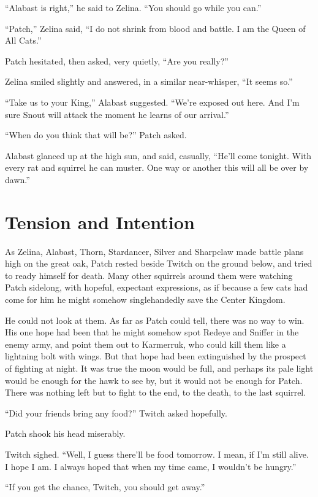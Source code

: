 \documentclass[12pt]{memoir}
\begin{document}
“Alabast is right,” he said to Zelina. “You should go while you can.”

“Patch,” Zelina said, “I do not shrink from blood and battle. I am the
Queen of All Cats.”

Patch hesitated, then asked, very quietly, “Are you really?”

Zelina smiled slightly and answered, in a similar near-whisper, “It
seems so.”

“Take us to your King,” Alabast suggested. “We’re exposed out
here. And I’m sure Snout will attack the moment he learns of our
arrival.”

“When do you think that will be?” Patch asked.

Alabast glanced up at the high sun, and said, casually, “He’ll come
tonight. With every rat and squirrel he can muster. One way or another
this will all be over by dawn.”


\section{Tension and Intention}

As Zelina, Alabast, Thorn, Stardancer, Silver and Sharpclaw made
battle plans high on the great oak, Patch rested beside Twitch on the
ground below, and tried to ready himself for death. Many other
squirrels around them were watching Patch sidelong, with hopeful,
expectant expressions, as if because a few cats had come for him he
might somehow singlehandedly save the Center Kingdom.

He could not look at them. As far as Patch could tell, there was no
way to win. His one hope had been that he might somehow spot Redeye
and Sniffer in the enemy army, and point them out to Karmerruk, who
could kill them like a lightning bolt with wings. But that hope had
been extinguished by the prospect of fighting at night. It was true
the moon would be full, and perhaps its pale light would be enough for
the hawk to see by, but it would not be enough for Patch. There was
nothing left but to fight to the end, to the death, to the last
squirrel.

“Did your friends bring any food?” Twitch asked hopefully.

Patch shook his head miserably.

Twitch sighed. “Well, I guess there’ll be food tomorrow. I mean, if
I’m still alive. I hope I am. I always hoped that when my time came, I
wouldn’t be hungry.”

“If you get the chance, Twitch, you should get away.”
\end{document}
